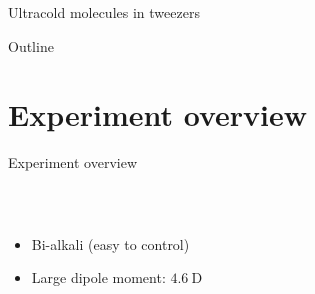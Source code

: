 \documentclass{beamer}
\begin{document}
\begin{frame}{Ultracold molecules in tweezers}
\begin{center}
  \end{center}
\end{frame}

\begin{frame}{Outline}
  \tableofcontents
\end{frame}

\section{Experiment overview}
\begin{frame}[t]{Experiment overview}
  \begin{columns}
    \column{5.8cm}
    \column{5.8cm}
    \begin{center}
      {}\\
      \begin{itemize}
      \item Bi-alkali (easy to control)
      \item Large dipole moment: $4.6\ \mathrm{D}$
      \end{itemize}
    \end{center}
  \end{columns}
\end{frame}
\end{document}
